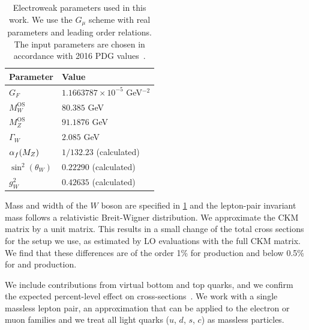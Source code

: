 \begin{table}[]
  \centering
  \begin{tabular}{p{3.5cm}p{5cm}}
    \toprule
    Parameter & Value  \\
    \midrule
    $G_F$ & $1.1663787 \times 10^{-5}$ GeV$^{-2}$ \\
    $M_W^{\text{OS}}$& $80.385$ GeV \\
    $M_Z^{\text{OS}}$& $91.1876$ GeV \\
    $\Gamma_W$& $2.085$ GeV \\
    $\alpha_f(M_Z)$ & $1/132.23$ (calculated)\\
    $\sin^2(\theta_W)$ & $0.22290$ (calculated)\\
    $g_W^2$ & $0.42635$ (calculated)\\
    \bottomrule
  \end{tabular}
  \caption{Electroweak parameters used in this work. We use the $G_\mu$
    scheme with real parameters and leading order relations. The input parameters
    are chosen in accordance with 2016 PDG
    values~\cite{Patrignani:2016xqp}.}
    \label{tab:ewinput}
  \end{table}

Mass and width of the $W$ boson are specified in \cref{tab:ewinput} and the lepton-pair invariant mass follows a relativistic Breit-Wigner distribution. We approximate the CKM matrix by a unit matrix. This
results in a small change of the total cross sections for the setup we use, as
estimated by LO evaluations with the full CKM matrix. We find that these differences are of the order 1\% for \Wbb{} production and
below 0.5\% for \Wbbnj[1]{} and \Wbbnj[2]{} production.

We include contributions from virtual bottom and top quarks, and we confirm the
expected percent-level effect on
cross-sections~\cite{BH:W4j,BH:Z4j,Campbell:2016tcu}. We work with a single massless
lepton pair, an approximation that can be applied to the electron or muon
families and we treat all light quarks ($u$, $d$, $s$, $c$) as massless particles.

